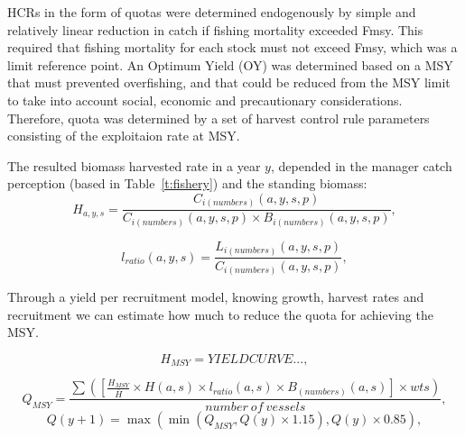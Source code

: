 \documentclass[12pt,oneline,a4paper,numbib]{ouparticle}
\numberwithin{equation}{subsection} %
\begin{document}
HCRs in the form of quotas were determined endogenously by simple and relatively linear reduction in catch if fishing mortality exceeded Fmsy. This required that fishing mortality for each stock must not exceed Fmsy, which was a limit reference point. An Optimum Yield (OY) was determined based on a MSY that must prevented overfishing, and that could be reduced from the MSY limit to take into account social, economic and precautionary considerations.  Therefore, quota was determined by a set of harvest control rule parameters consisting of the exploitaion rate at MSY.

The resulted biomass harvested rate in a year $y$, depended in the manager catch perception (based in Table~\ref{t:fishery}) and the standing biomass:
\begin{equation}
 H_{a, y, s} =\frac
                {C_{i (numbers)}(a, y, s, p)}
                {C_{i (numbers)}(a, y, s, p) \times B_{i (numbers)}(a, y, s, p)},
\end{equation}


\begin{equation}
 l_{ratio} (a, y, s) = \frac
                {L_{i (numbers)}(a, y, s, p)}
                {C_{i (numbers)}(a, y, s, p)},
\end{equation}

Through a yield per recruitment model, knowing growth, harvest rates and recruitment we can estimate how much to reduce the quota for achieving the MSY. 

\begin{equation}
 H_{MSY} = YIELD CURVE..., 
\end{equation}

\begin{equation}
 Q_{MSY} = \frac
                {\sum( [\frac{H_{MSY}}{\bar{H}} \times H (a, s) \times l_{ratio} (a, s) \times B_{(numbers)}(a, s)] \times wts) }
                {number\  of\  vessels}, 
\end{equation}
\begin{equation}
 Q (y+1) = \max( \min(Q_{MSY}, Q(y) \times 1.15), Q(y) \times 0.85), 
\end{equation}



\end{document}
